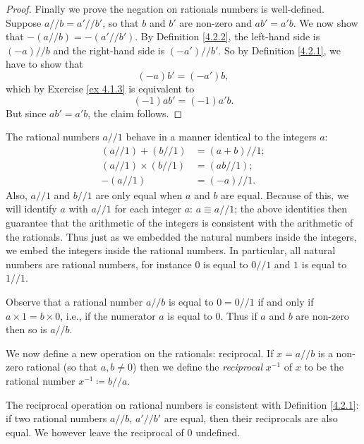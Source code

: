\begin{proof}
    Finally we prove the negation on rationals numbers is well-defined.
    Suppose \(a // b = a' // b'\), so that \(b\) and \(b'\) are non-zero and \(ab' = a'b\).
    We now show that \(-(a // b) = -(a' // b')\).
    By Definition \ref{4.2.2}, the left-hand side is \((-a) // b\) and the right-hand side is \((-a') // b'\).
    So by Definition \ref{4.2.1}, we have to show that
    \[
        (-a)b' = (-a')b,
    \]
    which by Exercise \ref{ex 4.1.3} is equivalent to
    \[
        (-1)ab' = (-1)a'b.
    \]
    But since \(ab' = a'b\), the claim follows.
\end{proof}

\begin{note}
    The rational numbers \(a // 1\) behave in a manner identical to the integers \(a\):
    \begin{align*}
        (a // 1) + (b // 1)      & = (a + b) // 1; \\
        (a // 1) \times (b // 1) & = (ab // 1);    \\
        -(a // 1)                & = (-a) // 1.
    \end{align*}
    Also, \(a // 1\) and \(b // 1\) are only equal when \(a\) and \(b\) are equal.
    Because of this, we will identify \(a\) with \(a // 1\) for each integer \(a\): \(a \equiv a // 1\);
    the above identities then guarantee that the arithmetic of the integers is consistent with the arithmetic of the rationals.
    Thus just as we embedded the natural numbers inside the integers, we embed the integers inside the rational numbers.
    In particular, all natural numbers are rational numbers, for instance \(0\) is equal to \(0 // 1\) and \(1\) is equal to \(1 // 1\).
\end{note}

\begin{note}
    Observe that a rational number \(a // b\) is equal to \(0 = 0 // 1\) if and only if \(a \times 1 = b \times 0\), i.e., if the numerator \(a\) is equal to \(0\).
    Thus if \(a\) and \(b\) are non-zero then so is \(a // b\).
\end{note}

\begin{note}
    We now define a new operation on the rationals: reciprocal.
    If \(x = a // b\) is a non-zero rational (so that \(a, b \neq 0\)) then we define the \emph{reciprocal} \(x^{-1}\) of \(x\) to be the rational number \(x^{-1} \coloneqq b // a\).
\end{note}

\begin{additional corollary}\label{ac 4.2.2}
The reciprocal operation on rational numbers is consistent with Definition \ref{4.2.1}:
if two rational numbers \(a // b\), \(a' // b'\) are equal, then their reciprocals are also equal.
We however leave the reciprocal of \(0\) undefined.
\end{additional corollary}

